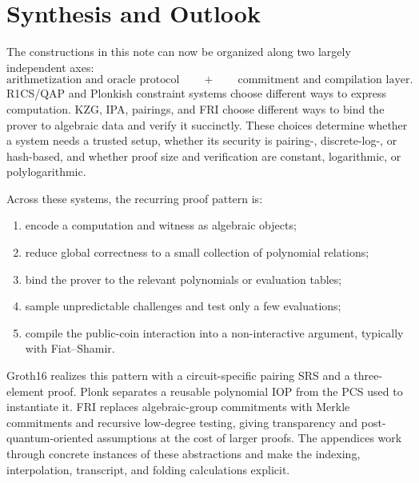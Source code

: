 \section{Synthesis and Outlook}

The constructions in this note can now be organized along two largely independent axes:
\[
\boxed{\text{arithmetization and oracle protocol}}
\qquad+\qquad
\boxed{\text{commitment and compilation layer}}.
\]
R1CS/QAP and Plonkish constraint systems choose different ways to express computation. KZG, IPA, pairings, and FRI choose different ways to bind the prover to algebraic data and verify it succinctly. These choices determine whether a system needs a trusted setup, whether its security is pairing-, discrete-log-, or hash-based, and whether proof size and verification are constant, logarithmic, or polylogarithmic.

Across these systems, the recurring proof pattern is:
\begin{enumerate}[leftmargin=2em]
    \item encode a computation and witness as algebraic objects;
    \item reduce global correctness to a small collection of polynomial relations;
    \item bind the prover to the relevant polynomials or evaluation tables;
    \item sample unpredictable challenges and test only a few evaluations;
    \item compile the public-coin interaction into a non-interactive argument, typically with Fiat--Shamir.
\end{enumerate}

Groth16 realizes this pattern with a circuit-specific pairing SRS and a three-element proof. Plonk separates a reusable polynomial IOP from the PCS used to instantiate it. FRI replaces algebraic-group commitments with Merkle commitments and recursive low-degree testing, giving transparency and post-quantum-oriented assumptions at the cost of larger proofs. The appendices work through concrete instances of these abstractions and make the indexing, interpolation, transcript, and folding calculations explicit.
